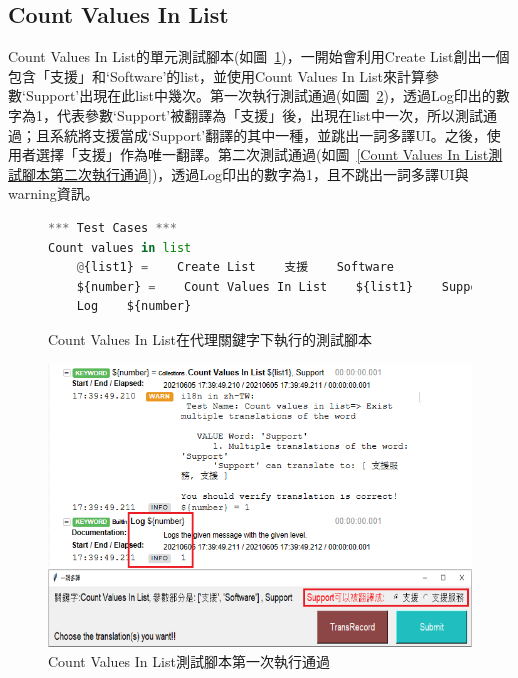 \subsection{Count Values In List}
Count Values In List的單元測試腳本(如圖~\ref{Count Values In List在代理關鍵字下執行的測試腳本})，一開始會利用Create List創出一個包含「支援」和‘Software’的list，並使用Count Values In List來計算參數‘Support’出現在此list中幾次。第一次執行測試通過(如圖~\ref{Count Values In List測試腳本第一次執行通過})，透過Log印出的數字為1，代表參數‘Support’被翻譯為「支援」後，出現在list中一次，所以測試通過；且系統將支援當成‘Support’翻譯的其中一種，並跳出一詞多譯UI。之後，使用者選擇「支援」作為唯一翻譯。第二次測試通過(如圖~\ref{Count Values In List測試腳本第二次執行通過})，透過Log印出的數字為1，且不跳出一詞多譯UI與warning資訊。
\hspace*{\fill} \\
\begin{figure}[H]
\begin{lstlisting}[language={python}]
*** Test Cases ***
Count values in list
    @{list1} =    Create List    支援    Software
    ${number} =    Count Values In List    ${list1}    Support
    Log    ${number}
\end{lstlisting}
\caption{Count Values In List在代理關鍵字下執行的測試腳本}
\label{Count Values In List在代理關鍵字下執行的測試腳本}
\end{figure}

\begin{figure}[H]
\centering
\includegraphics[width= .9\textwidth]{../論文截圖/4.1.2-2 count values in list 1st run.png}
\caption{Count Values In List測試腳本第一次執行通過}
\label{Count Values In List測試腳本第一次執行通過}
\end{figure}

